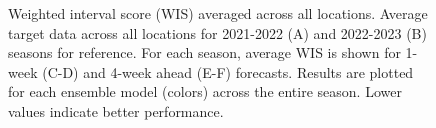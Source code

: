 \documentclass[
  letterpaper,
  DIV=11,
  numbers=noendperiod]{scrartcl}
\begin{document}
\begin{figure}


\caption{\label{fig-wis-vs-forecast-date}Weighted interval score (WIS)
averaged across all locations. Average target data across all locations
for 2021-2022 (A) and 2022-2023 (B) seasons for reference. For each
season, average WIS is shown for 1-week (C-D) and 4-week ahead (E-F)
forecasts. Results are plotted for each ensemble model (colors) across
the entire season. Lower values indicate better performance.}

\end{figure}%
\end{document}

